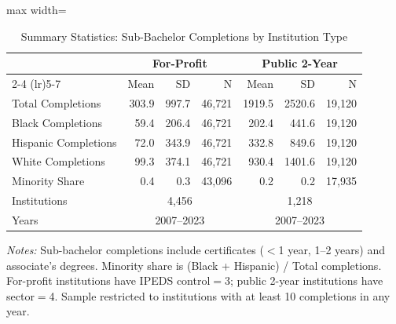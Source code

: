 \begin{table}[H]
\centering
\caption{Summary Statistics: Sub-Bachelor Completions by Institution Type}
\label{tab:summary}
\begin{threeparttable}
\begin{adjustbox}{max width=\textwidth}
\begin{tabular}{lrrrrrr}
\toprule
 & \multicolumn{3}{c}{For-Profit} & \multicolumn{3}{c}{Public 2-Year} \\
\cmidrule(lr){2-4} \cmidrule(lr){5-7}
 & Mean & SD & N & Mean & SD & N \\
\midrule
Total Completions & 303.9 & 997.7 & 46,721 & 1919.5 & 2520.6 & 19,120 \\
Black Completions & 59.4 & 206.4 & 46,721 & 202.4 & 441.6 & 19,120 \\
Hispanic Completions & 72.0 & 343.9 & 46,721 & 332.8 & 849.6 & 19,120 \\
White Completions & 99.3 & 374.1 & 46,721 & 930.4 & 1401.6 & 19,120 \\
Minority Share & 0.4 & 0.3 & 43,096 & 0.2 & 0.2 & 17,935 \\
\midrule
Institutions & \multicolumn{3}{c}{4,456} & \multicolumn{3}{c}{1,218} \\
Years & \multicolumn{3}{c}{2007--2023} & \multicolumn{3}{c}{2007--2023} \\
\bottomrule
\end{tabular}
\end{adjustbox}
\begin{tablenotes}[flushleft]
\small
\item \textit{Notes:} Sub-bachelor completions include certificates ($<$1 year, 1--2 years) and associate's degrees. Minority share is (Black + Hispanic) / Total completions. For-profit institutions have IPEDS control$=$3; public 2-year institutions have sector$=$4. Sample restricted to institutions with at least 10 completions in any year.
\end{tablenotes}
\end{threeparttable}
\end{table}
